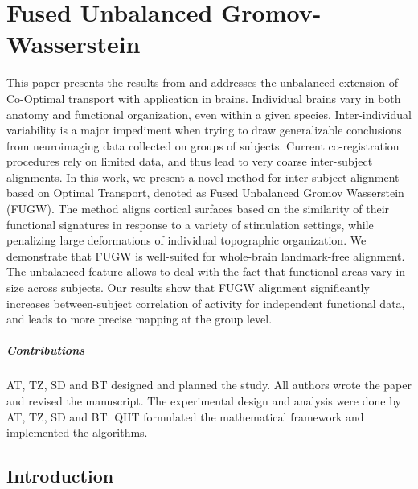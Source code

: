 
\chapter{Fused Unbalanced Gromov-Wasserstein}

\renewcommand{\contentsname}{Contents}
\localtableofcontents*
{}

\hfill \break
This paper presents the results from \citep{Thual22} and addresses the unbalanced extension
of Co-Optimal transport with application in brains.
Individual brains vary in both anatomy and functional organization, even within a given species.
Inter-individual variability is a major impediment when trying to draw generalizable conclusions
from neuroimaging data collected on groups of subjects.
Current co-registration procedures rely on limited data, and thus lead to very coarse
inter-subject alignments.
In this work, we present a novel method for inter-subject alignment based on Optimal Transport,
denoted as Fused Unbalanced Gromov Wasserstein (FUGW).
The method aligns cortical surfaces based on the similarity of their functional signatures in
response to a variety of stimulation settings, while penalizing large deformations of
individual topographic organization.
We demonstrate that FUGW is well-suited for whole-brain landmark-free alignment.
The unbalanced feature allows to deal with the fact that functional areas
vary in size across subjects. Our results show that FUGW alignment significantly
increases between-subject correlation of activity for independent functional data,
and leads to more precise mapping at the group level.

\paragraph{Contributions} AT, TZ, SD and BT designed and planned the study. All authors wrote
the paper and revised the manuscript. The experimental design and analysis were done
by AT, TZ, SD and BT. QHT formulated the mathematical framework and implemented the algorithms.

\raggedbottom

\section{Introduction}
\label{sec:introduction}


